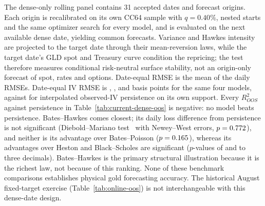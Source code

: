 The dense-only rolling panel contains 31 accepted dates and \OosDates{}
forecast origins. Each origin is recalibrated on its own CC64 sample with
$q=0.40\%$, nested starts and the same optimizer search for every model, and
is evaluated on the next available dense date, yielding \OosObservations{}
common forecasts. Variance and Hawkes intensity are projected to the target
date through their mean-reversion laws, while the target date's GLD spot and
Treasury curve condition the repricing; the test therefore measures conditional
risk-neutral surface stability, not an origin-only forecast of spot, rates and
options. Date-equal RMSE is the mean of the daily RMSEs. Date-equal IV RMSE is \OosBSRMSE, \OosHRMSE, \OosBRMSE{} and
\OosWRMSE{} basis points for the same four models, against \OosPersistenceRMSE{}
for interpolated observed-IV persistence on its own support. Every
$R^2_{OOS}$ against persistence in Table~\ref{tab:current-dense-oos} is
negative: no model beats persistence. Bates--Hawkes comes closest; its
daily loss difference from persistence is not significant (Diebold--Mariano
test~\cite{DieboldMariano1995} with Newey--West errors, $p=0.772$), and neither is its advantage over Bates--Poisson
($p=0.165$), whereas its advantages over Heston and
Black--Scholes are significant ($p$-values of \OosDMHawkesVsHP{} and
\OosDMHawkesVsBSP{} to three decimals). Bates--Hawkes is the primary
structural illustration because it is the richest law, not because of this
ranking. None of these benchmark comparisons establishes physical gold
forecasting accuracy. The historical August fixed-target exercise
(Table~\ref{tab:online-oos}) is not interchangeable with this dense-date
design.

